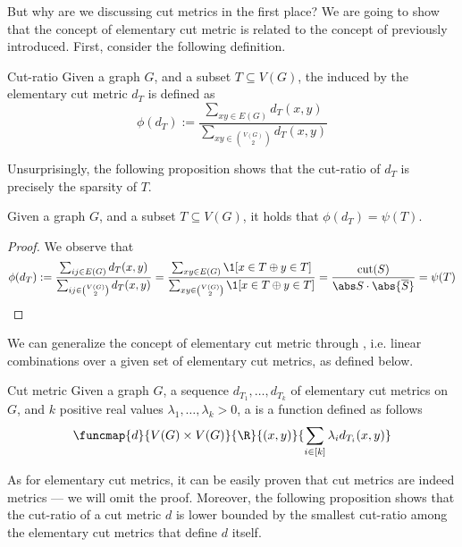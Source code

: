 \documentclass[a4paper, 12pt]{report}
\begin{document}
    But why are we discussing cut metrics in the first place? We are going to show that the concept of elementary cut metric is  related to the concept of  previously introduced. First, consider the following definition.

    \begin{frameddefn}{Cut-ratio}
        Given a graph $G$, and a subset $T \subseteq V(G)$, the  induced by the elementary cut metric $d_T$ is defined as $$\phi(d_T) := \dfrac{\sum_{xy \in E(G)}{d_T(x, y)}}{\sum_{xy \in \binom{V(G)}{2}}{d_T(x, y)}}$$
    \end{frameddefn}

    Unsurprisingly, the following proposition shows that the cut-ratio of $d_T$ is precisely the sparsity of $T$.

    \begin{framedprop}[label={sparse prop}]{}
        Given a graph $G$, and a subset $T \subseteq V(G)$, it holds that $\phi(d_T) = \psi(T)$.
    \end{framedprop}
    
    \begin{proof}
        We observe that $$\phi(d_T) := \dfrac{\sum_{ij \in E(G)}{d_T(x, y)}}{\sum_{ij \in \binom{V(G)}{2}}{d_T(x, y)}} = \dfrac{\sum_{xy \in E(G)}{\1[x \in T \oplus y \in T]}}{\sum_{xy \in \binom{V(G)}{2}}{\1[x \in T \oplus y \in T]}} = \dfrac{\mathrm{cut}(S)}{\abs S \cdot \abs{\overline S}} = \psi(T)$$
    \end{proof}

    We can generalize the concept of elementary cut metric through , i.e. linear combinations over a given set of elementary cut metrics, as defined below.

    \begin{frameddefn}{Cut metric}
        Given a graph $G$, a sequence $d_{T_1}, \ldots, d_{T_k}$ of elementary cut metrics on $G$, and $k$ positive real values $\lambda_1, \ldots, \lambda_k > 0$, a  is a function defined as follows $$\funcmap{d}{V(G) \times V(G)}{\R}{(x, y)}{\sum_{i \in [k]}{\lambda_i d_{T_i}(x, y)}}$$
    \end{frameddefn}

    As for elementary cut metrics, it can be easily proven that cut metrics are indeed metrics --- we will omit the proof. Moreover, the following proposition shows that the cut-ratio of a cut metric $d$ is lower bounded by the smallest cut-ratio among the elementary cut metrics that define $d$ itself.
\end{document}
